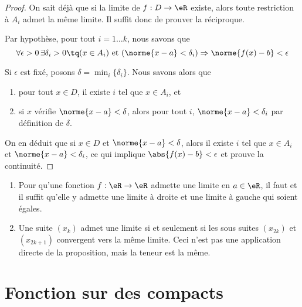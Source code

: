 \begin{proof}On sait déjà que si la limite de $f : D \to \eR$
  existe, alors toute restriction à $A_i$ admet la même limite. Il
  suffit donc de prouver la réciproque.

  Par hypothèse, pour tout $i = 1 \ldots k$, nous savons que
  \begin{equation*}
    \forall \epsilon > 0\, \exists \delta_i > 0 \tq (x \in A_i)
    \text{ et }
    (\norme{x-a} < \delta_i) \Rightarrow \norme{f(x) - b} < \epsilon
  \end{equation*}

  Si $\epsilon$ est fixé, posons $\delta = \min_i\{\delta_i\}$. Nous
  savons alors que
  \begin{enumerate}
  \item pour tout $x \in D$, il existe $i$ tel que $x \in A_i$, et
  \item si $x$ vérifie $\norme{x-a} < \delta$, alors pour tout $i$,
    $\norme{x-a} < \delta_i$ par définition de $\delta$.
  \end{enumerate}
  
  On en déduit que si $x \in D$ et $\norme{x-a} < \delta$, alors il
  existe $i$ tel que $x \in A_i$ et $\norme{x-a} < \delta_i$, ce qui
  implique $\abs{f(x) - b} < \epsilon$ et prouve la continuité.
\end{proof}

\begin{example}
  \begin{enumerate}
  \item Pour qu'une fonction $f : \eR \to \eR$ admette une limite en
    $a \in \eR$, il faut et il suffit qu'elle y admette une limite à
    droite et une limite à gauche qui soient égales.

  \item Une suite $(x_k)$ admet une limite si et seulement si les
    sous suites $(x_{2k})$ et $(x_{2k+1})$ convergent vers la même
    limite. Ceci n'est pas une application directe de la proposition,
    mais la teneur est la même.
  \end{enumerate}
\end{example}

\section{Fonction sur des compacts}		\label{SecFonctionsSurCompacts}


